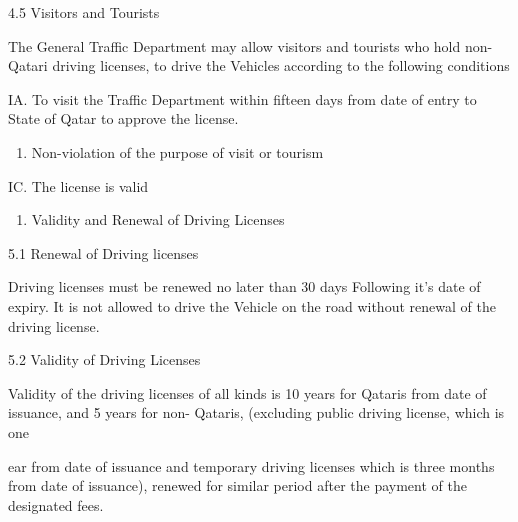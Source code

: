 \documentclass{book}
\begin{document}
4.5 Visitors and Tourists

The General Traffic Department may allow visitors and tourists who hold
non-Qatari driving licenses, to drive the Vehicles according to the
following conditions

IA. To visit the Traffic Department within fifteen days from date of
entry to State of Qatar to approve the license.

\begin{enumerate}
	\def\labelenumi{\arabic{enumi}.}
	\setcounter{enumi}{7}
	\tightlist
	\item
	      Non-violation of the purpose of visit or tourism
\end{enumerate}

IC. The license is valid

\begin{enumerate}
	\def\labelenumi{\arabic{enumi}.}
	\setcounter{enumi}{4}
	\tightlist
	\item
	      Validity and Renewal of Driving Licenses
\end{enumerate}

5.1 Renewal of Driving licenses

Driving licenses must be renewed no later than 30 days Following it's
date of expiry. It is not allowed to drive the Vehicle on the road
without renewal of the driving license.

5.2 Validity of Driving Licenses

Validity of the driving licenses of all kinds is 10 years for Qataris
from date of issuance, and 5 years for non- Qataris, (excluding public
driving license, which is one

ear from date of issuance and temporary driving licenses which is three
months from date of issuance), renewed for similar period after the
payment of the designated fees.
\end{document}
